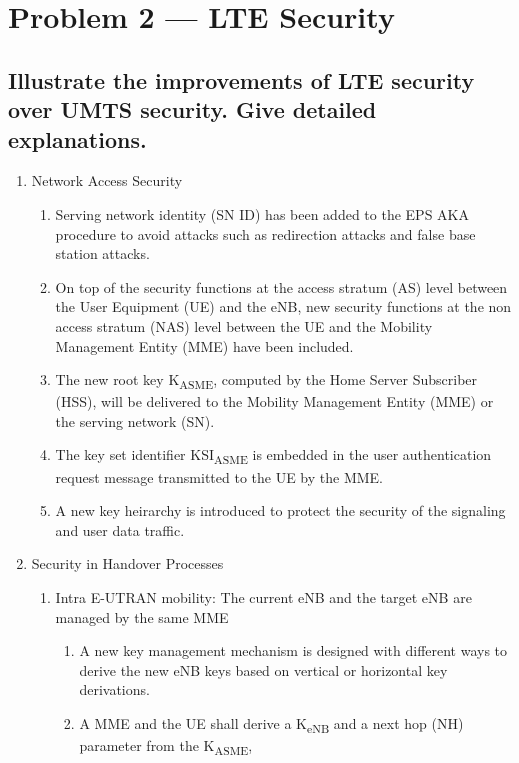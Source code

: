 \documentclass[a4paper]{report}
\begin{document}
\section{Problem 2 --- LTE Security}

\subsection{Illustrate the improvements of LTE security over UMTS security.
            Give detailed explanations.}

\begin{enumerate}
\item Network Access Security
    \begin{enumerate}
    \item Serving network identity (SN ID) has been added to the EPS AKA procedure to avoid attacks 
             such as redirection attacks and false base station attacks.
    \item On top of the security functions at the access stratum (AS) level between the User Equipment
             (UE) and the eNB, new security functions at the non access stratum (NAS) level between the 
             UE and the Mobility Management Entity (MME) have been included.
    \item The new root key K\textsubscript{ASME}, computed by the Home Server Subscriber (HSS), will be delivered
             to the Mobility Management Entity (MME) or the serving network (SN).
    \item The key set identifier KSI\textsubscript{ASME} is embedded in the user authentication request message
             transmitted to the UE by the MME.
    \item A new key heirarchy is introduced to protect the security of the signaling and user data traffic.
    \end{enumerate}
\item Security in Handover Processes
    \begin{enumerate}
    \item Intra E-UTRAN mobility: The current eNB and the target eNB are managed by the same MME
        \begin{enumerate}
        \item A new key management mechanism is designed with different ways to derive the new eNB keys
                 based on vertical or horizontal key derivations.
        \item A MME and the UE shall derive a K\textsubscript{eNB} and a next hop (NH) parameter from the K\textsubscript{ASME},

\end{enumerate}
\end{enumerate}
\end{enumerate}
\end{document}
